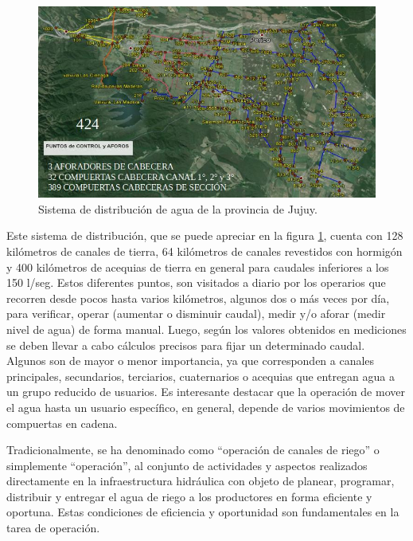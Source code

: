 \begin{figure}[h]
\centering
\includegraphics[scale=.70]{./Figures/canal.jpeg}
\caption{Sistema de distribución de agua de la provincia de Jujuy.}
\label{fig:canal}
\end{figure}

Este sistema de distribución, que se puede apreciar en la figura \ref{fig:canal}, cuenta con 128 kilómetros de canales de tierra, 64 kilómetros de canales revestidos con hormigón y 400 kilómetros de acequias de tierra en general para caudales inferiores a los 150 l/seg.
Estos diferentes puntos, son visitados a diario por los operarios que recorren desde pocos hasta varios kilómetros, algunos dos o más veces por día, para verificar, operar (aumentar o disminuir caudal), medir y/o aforar (medir nivel de agua) de forma manual. Luego, según los valores obtenidos en mediciones se deben llevar a cabo cálculos precisos para fijar un determinado caudal. Algunos son de mayor o menor importancia, ya que corresponden a canales principales, secundarios, terciarios, cuaternarios o acequias que entregan agua a un grupo reducido de usuarios.
Es interesante destacar que la operación de mover el agua hasta un usuario específico, en general, depende de varios movimientos de compuertas en cadena.

Tradicionalmente, se ha denominado como “operación de canales de riego” o simplemente “operación”, al conjunto de actividades y aspectos realizados directamente en la infraestructura hidráulica con objeto de planear, programar, distribuir y entregar el agua de riego a los productores en forma eficiente y oportuna. Estas condiciones de eficiencia y oportunidad son fundamentales en la tarea de operación.

